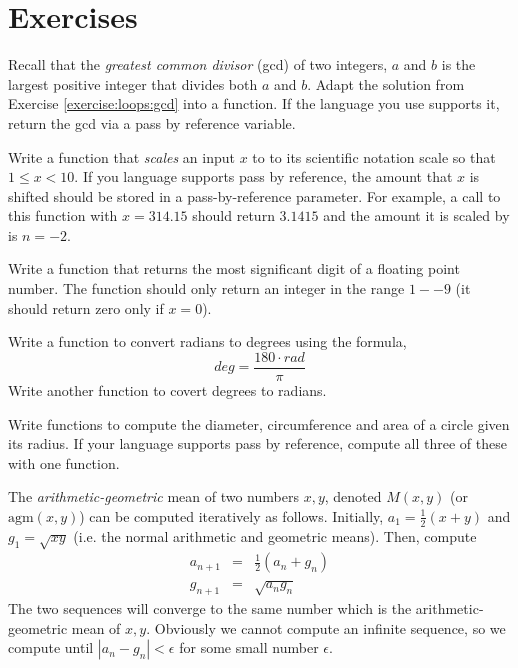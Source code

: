 

\section{Exercises}

\begin{exer}
Recall that the \emph{greatest common divisor} (gcd) of two integers, 
$a$ and $b$ is the largest positive integer that divides both $a$ and
$b$.  Adapt the solution from Exercise \ref{exercise:loops:gcd} into
a function.  If the language you use supports it, return the gcd via
a pass by reference variable.
\end{exer}

\begin{exer}
Write a function that \emph{scales} an input $x$ to to its scientific
notation scale so that $1 \leq x < 10$.  If you language supports 
pass by reference, the amount that $x$ is shifted should be stored 
in a pass-by-reference parameter.  For example, a call to this function 
with $x = 314.15$ should return $3.1415$ and the amount it is scaled
by is $n=-2$.
\end{exer}

\begin{exer}
Write a function that returns the most significant digit of a floating
point number.  The function should only return an integer in the range 
$1--9$ (it should return zero only if $x = 0$).
\end{exer}

\begin{exer}
Write a function to convert radians to degrees using the formula,
  $$deg = \frac{180\cdot rad}{\pi}$$
Write another function to covert degrees to radians.
\end{exer}

\begin{exer}
Write functions to compute the diameter, circumference and
area of a circle given its radius.  If your language supports 
pass by reference, compute all three of these with one function.
\end{exer}

\begin{exer}
The \emph{arithmetic-geometric} mean of two numbers $x, y$, denoted 
$M(x, y)$ (or $\mathrm{agm}(x, y)$) can be computed iteratively as 
follows.  Initially, $a_1 = \frac{1}{2}(x + y)$ and $g_1 = \sqrt{xy}$ (i.e. the 
normal arithmetic and geometric means).  Then, compute
  $$\begin{array}{rcl}
    a_{n+1} & = & \frac{1}{2}(a_n+g_n) \\
    g_{n+1} & = & \sqrt{a_n g_n}
    \end{array}$$
The two sequences will converge to the same number which is the arithmetic-geometric 
mean of $x, y$.  Obviously we cannot compute an infinite sequence, so we compute until
$|a_n - g_n| < \epsilon$ for some small number $\epsilon$.
\end{exer}

